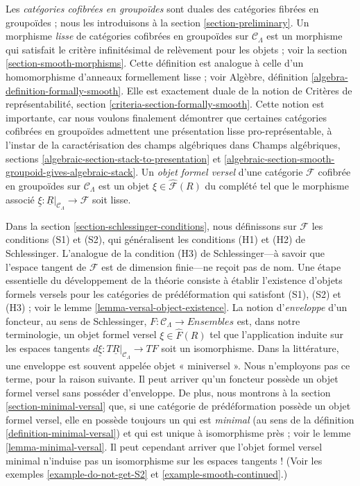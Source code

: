 \medskip\noindent
Les {\it catégories cofibrées en groupoïdes} sont duales des catégories
fibrées en groupoïdes ; nous les introduisons à la section
\ref{section-preliminary}. Un morphisme {\it lisse} de catégories cofibrées
en groupoïdes sur $\mathcal{C}_\Lambda$ est un morphisme qui satisfait le
critère infinitésimal de relèvement pour les objets ; voir la
section \ref{section-smooth-morphisms}.
Cette définition est analogue à celle d'un homomorphisme d'anneaux
formellement lisse ; voir Algèbre, définition
\ref{algebra-definition-formally-smooth}. Elle est exactement duale de la
notion de Critères de représentabilité, section
\ref{criteria-section-formally-smooth}. Cette notion est importante, car nous
voulons finalement démontrer que certaines catégories cofibrées en groupoïdes
admettent une présentation lisse pro-représentable, à l'instar de la
caractérisation des champs algébriques dans Champs algébriques, sections
\ref{algebraic-section-stack-to-presentation} et
\ref{algebraic-section-smooth-groupoid-gives-algebraic-stack}.
Un {\it objet formel versel} d'une catégorie $\mathcal{F}$ cofibrée en
groupoïdes sur $\mathcal{C}_\Lambda$ est un objet
$\xi \in \widehat{\mathcal{F}}(R)$ du complété tel que le morphisme
associé
$\underline{\xi} : \underline{R}|_{\mathcal{C}_\Lambda} \to \mathcal{F}$
soit lisse.

\medskip\noindent
Dans la section \ref{section-schlessinger-conditions}, nous définissons sur
$\mathcal{F}$ les conditions (S1) et (S2), qui généralisent les conditions
(H1) et (H2) de Schlessinger. L'analogue de la condition (H3) de
Schlessinger---à savoir que l'espace tangent de $\mathcal{F}$ est de dimension
finie---ne reçoit pas de nom. Une étape essentielle du développement de la
théorie consiste à établir l'existence d'objets formels versels pour les
catégories de prédéformation qui satisfont (S1), (S2) et (H3) ; voir le
lemme \ref{lemma-versal-object-existence}.
La notion d'{\it enveloppe} d'un foncteur, au sens de Schlessinger,
$F : \mathcal{C}_\Lambda \to \textit{Ensembles}$
est, dans notre terminologie, un objet formel versel
$\xi \in \widehat{F}(R)$ tel que l'application induite sur les espaces tangents
$d\underline{\xi} : T\underline{R}|_{\mathcal{C}_\Lambda} \to TF$
soit un isomorphisme. Dans la littérature, une enveloppe est souvent appelée
objet « miniversel ». Nous n'employons pas ce terme, pour la raison suivante.
Il peut arriver qu'un foncteur possède un objet formel versel sans posséder
d'enveloppe. De plus, nous montrons à la section
\ref{section-minimal-versal} que, si une catégorie de prédéformation possède
un objet formel versel, elle en possède toujours un qui est {\it minimal}
(au sens de la définition \ref{definition-minimal-versal}) et qui est unique
à isomorphisme près ; voir le lemme \ref{lemma-minimal-versal}.
Il peut cependant arriver que l'objet formel versel minimal n'induise pas
un isomorphisme sur les espaces tangents ! (Voir les exemples
\ref{example-do-not-get-S2} et
\ref{example-smooth-continued}.)

